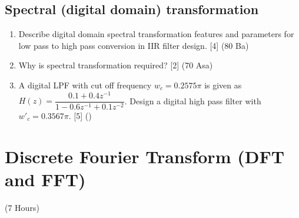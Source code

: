\documentclass[12pt]{article}
\begin{document}
  \subsection{Spectral (digital domain) transformation}
    \begin{enumerate}[topsep=0pt, noitemsep]
      \item Describe digital domain spectral transformation features and parameters for low pass to high pass conversion in IIR filter design. \hfill [4] (80 Ba)
      \item Why is spectral transformation required? \hfill [2] (70 Asa)
      \item A digital LPF with cut off frequency $w_c=0.2575\pi$ is given as $H(z)=\dfrac{0.1+0.4z^{-1}}{1-0.6z^{-1}+0.1z^{-2}}$. Design a digital high pass filter with $w'_c=0.3567\pi$. \hfill [5] ()
    \end{enumerate}

\pagebreak
\section{Discrete Fourier Transform (DFT and FFT)}
\begin{center}(7 Hours)\end{center}
\end{document}
